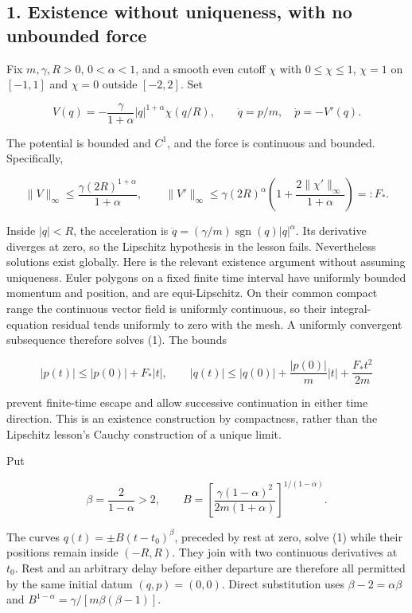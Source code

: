 \documentclass[11pt,a4paper]{article}
\begin{document}
\hypertarget{existence-without-uniqueness-with-no-unbounded-force}{%
\subsection{1. Existence without uniqueness, with no unbounded
force}\label{existence-without-uniqueness-with-no-unbounded-force}}

Fix \(m,\gamma,R>0\), \(0<\alpha<1\), and a smooth even cutoff \(\chi\)
with \(0\le\chi\le1\), \(\chi=1\) on \([-1,1]\) and \(\chi=0\) outside
\([-2,2]\). Set

\[
 V(q)=-\frac{\gamma}{1+\alpha}|q|^{1+\alpha}\chi(q/R),
 \qquad \dot q=p/m,\quad \dot p=-V'(q).
 \tag{1}
\]

The potential is bounded and \(C^1\), and the force is continuous and
bounded. Specifically,

\[
 \|V\|_\infty\le\frac{\gamma(2R)^{1+\alpha}}{1+\alpha},\qquad
 \|V'\|_\infty\le\gamma(2R)^\alpha
 \left(1+\frac{2\|\chi'\|_\infty}{1+\alpha}\right)=:F_*.
 \tag{2}
\]

Inside \(|q|<R\), the acceleration is
\(\ddot q=(\gamma/m)\operatorname{sgn}(q)|q|^\alpha\). Its derivative
diverges at zero, so the Lipschitz hypothesis in the lesson fails.
Nevertheless solutions exist globally. Here is the relevant existence
argument without assuming uniqueness. Euler polygons on a fixed finite
time interval have uniformly bounded momentum and position, and are
equi-Lipschitz. On their common compact range the continuous vector
field is uniformly continuous, so their integral-equation residual tends
uniformly to zero with the mesh. A uniformly convergent subsequence
therefore solves (1). The bounds

\[
 |p(t)|\le |p(0)|+F_*|t|,\qquad
 |q(t)|\le |q(0)|+\frac{|p(0)|}{m}|t|+\frac{F_*t^2}{2m}
 \tag{3}
\]

prevent finite-time escape and allow successive continuation in either
time direction. This is an existence construction by compactness, rather
than the Lipschitz lesson's Cauchy construction of a unique limit.

Put

\[
 \beta=\frac{2}{1-\alpha}>2,\qquad
 B=\left[\frac{\gamma(1-\alpha)^2}{2m(1+\alpha)}
     \right]^{1/(1-\alpha)}.
 \tag{4}
\]

The curves \(q(t)=\pm B(t-t_0)^\beta\), preceded by rest at zero, solve
(1) while their positions remain inside \((-R,R)\). They join with two
continuous derivatives at \(t_0\). Rest and an arbitrary delay before
either departure are therefore all permitted by the same initial datum
\((q,p)=(0,0)\). Direct substitution uses \(\beta-2=\alpha\beta\) and
\(B^{1-\alpha}=\gamma/[m\beta(\beta-1)]\).
\end{document}
